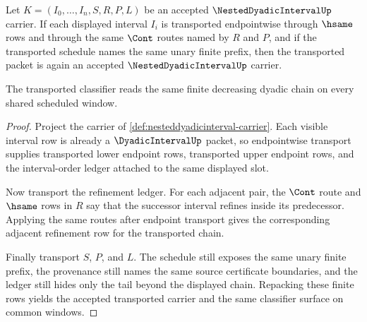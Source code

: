 \begin{theorem}
\label{thm:nesteddyadicinterval-window-transport}
Let $K=(I_0,\ldots,I_n,S,R,P,L)$ be an accepted $\NestedDyadicIntervalUp$ carrier. If each displayed interval $I_i$ is transported endpointwise through $\hsame$ rows and through the same $\Cont$ routes named by $R$ and $P$, and if the transported schedule names the same unary finite prefix, then the transported packet is again an accepted $\NestedDyadicIntervalUp$ carrier.

The transported classifier reads the same finite decreasing dyadic chain on every shared scheduled window.
\end{theorem}
\begin{proof}
Project the carrier of \autoref{def:nesteddyadicinterval-carrier}. Each visible interval row is already a $\DyadicIntervalUp$ packet, so endpointwise transport supplies transported lower endpoint rows, transported upper endpoint rows, and the interval-order ledger attached to the same displayed slot.

Now transport the refinement ledger. For each adjacent pair, the $\Cont$ route and $\hsame$ rows in $R$ say that the successor interval refines inside its predecessor. Applying the same routes after endpoint transport gives the corresponding adjacent refinement row for the transported chain.

Finally transport $S$, $P$, and $L$. The schedule still exposes the same unary finite prefix, the provenance still names the same source certificate boundaries, and the ledger still hides only the tail beyond the displayed chain. Repacking these finite rows yields the accepted transported carrier and the same classifier surface on common windows.
\end{proof}

